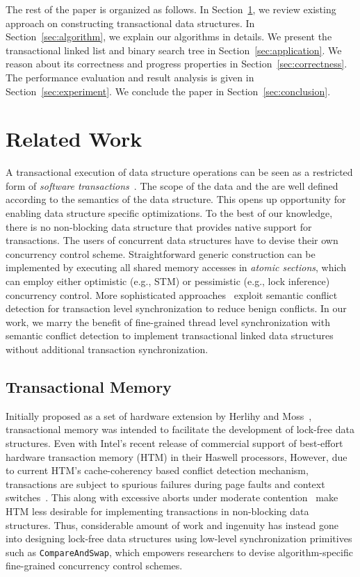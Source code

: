 \documentclass[10pt,conference,compsocconf]{IEEEtran}
\begin{document}
The rest of the paper is organized as follows. 
In Section~\ref{sec:related}, we review existing approach on constructing transactional data structures.
In Section~\ref{sec:algorithm}, we explain our algorithms in details.
We present the transactional linked list and binary search tree in Section~\ref{sec:application}.
We reason about its correctness and progress properties in Section~\ref{sec:correctness}.
The performance evaluation and result analysis is given in Section~\ref{sec:experiment}.
We conclude the paper in Section~\ref{sec:conclusion}.

\section{Related Work}
\label{sec:related}
A transactional execution of data structure operations can be seen as a restricted form of \emph{software transactions}~\cite{harris2010transactional}.
The scope of the data and the are well defined according to the semantics of the data structure.
This opens up opportunity for enabling data structure specific optimizations. 
To the best of our knowledge, there is no non-blocking data structure that provides native support for transactions.
The users of concurrent data structures have to devise their own concurrency control scheme. 
Straightforward generic construction can be implemented by executing all shared memory accesses in \emph{atomic sections}, which can employ either optimistic (e.g., STM) or pessimistic (e.g., lock inference) concurrency control.
More sophisticated approaches~\cite{} exploit semantic conflict detection for transaction level synchronization to reduce benign conflicts.
In our work, we marry the benefit of fine-grained thread level synchronization with semantic conflict detection to implement transactional linked data structures without additional transaction synchronization. 

\subsection{Transactional Memory}
Initially proposed as a set of hardware extension by Herlihy and Moss~\cite{herlihy1993transactional}, transactional memory was intended to facilitate the development of lock-free data structures.
Even with Intel's recent release of commercial support of best-effort hardware transaction memory (HTM) in their Haswell processors, 
However, due to current HTM's cache-coherency based conflict detection mechanism, transactions are subject to spurious failures during page faults and context switches~\cite{}.
This along with excessive aborts under moderate contention~\cite{christina2015resource} make HTM less desirable for implementing transactions in non-blocking data structures.
Thus, considerable amount of work and ingenuity has instead gone into designing lock-free data structures using low-level synchronization primitives such as \texttt{CompareAndSwap}, which empowers researchers to devise algorithm-specific fine-grained concurrency control schemes.
\end{document}
